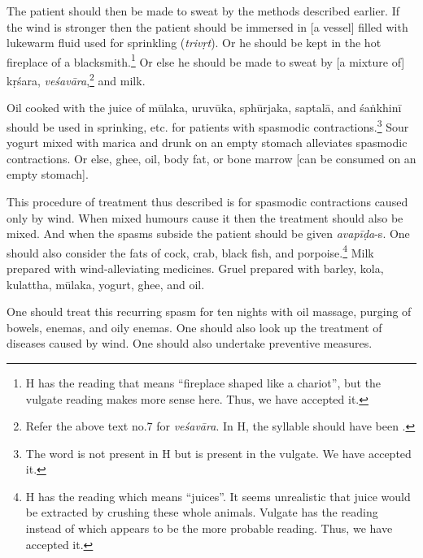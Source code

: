 \begin{translation}
    The patient should then be made to sweat by the methods described earlier. If the wind is stronger then the patient should be immersed in [a vessel] filled with lukewarm fluid used for sprinkling (\textit{trivṛt}). Or he should be kept in the hot fireplace of a blacksmith.\footnote{H has the reading  that means \enquote{fireplace shaped like a chariot}, but the vulgate reading  makes more sense here. Thus, we have accepted it.} Or else he should be made to sweat by [a mixture of] \gls{kṛśara}, \textit{veśavāra},\footnote{Refer the above text no.7 for \textit{veśavāra}. In H, the syllable  should have been .} and milk.
 
    Oil cooked with the juice of \gls{mūlaka}, \gls{uruvūka}, \gls{sphūrjaka}, \gls{saptalā}, and \gls{śaṅkhinī} should be used in sprinking, etc. for patients with spasmodic contractions.\footnote{The word  is not present in H but is present in the vulgate. We have accepted it.} Sour yogurt mixed with \gls{marica} and drunk on an empty stomach alleviates spasmodic contractions. Or else, ghee, oil, body fat, or bone marrow [can be consumed on an empty stomach]. 
    
    This procedure of treatment thus described is for spasmodic contractions caused only by wind. When mixed humours cause it then the treatment should also be mixed. And when the spasms subside the patient should be given \textit{avapīḍa}-s. One should also consider the fats of cock, crab, black fish, and porpoise.\footnote{H has the reading  which means \enquote{juices}. It seems unrealistic that juice would be extracted by crushing these whole animals. Vulgate has the reading  instead of  which appears to be the more probable reading. Thus, we have accepted it.} Milk prepared with wind-alleviating medicines. Gruel prepared with barley, \gls{kola}, \gls{kulattha}, \gls{mūlaka}, yogurt, ghee, and oil. 

    One should treat this recurring spasm for ten nights with oil massage, purging of bowels, enemas, and oily enemas. One should also look up the treatment of diseases caused by wind. One should also undertake preventive measures.   


\end{translation}
